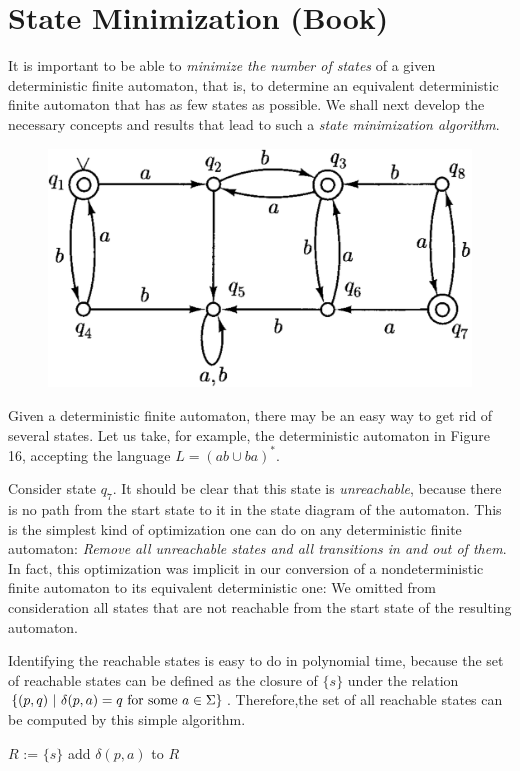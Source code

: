 \section{State Minimization (Book)}

It is important to be able to \textit{minimize the number of states} of a given deterministic finite automaton, that is, to determine an equivalent deterministic finite automaton that has as few states as possible. We shall next develop the necessary concepts and results that lead to such a \textit{state minimization algorithm}.

\begin{figure}[h!]
  \centering
  \includegraphics[width=.4\textwidth]{img/Fig2.19.png}
  \caption{}
\end{figure}

Given a deterministic finite automaton, there may be an easy way to get rid of several states. Let us take, for example, the deterministic automaton in Figure 16, accepting the language $L = (ab \cup ba)^*$. 

Consider state $q_7$. It should be clear that this state is \textit{unreachable}, because there is no path from the start state to it in the state diagram of the automaton. This is the simplest kind of optimization one can do on any deterministic finite automaton:\textit{ Remove all unreachable states and all transitions in and out of them}. In fact, this optimization was implicit in our conversion of a nondeterministic finite automaton to its equivalent deterministic one: We omitted from consideration all states that are not reachable from the start state of the resulting automaton.

Identifying the reachable states is easy to do in polynomial time, because the set of reachable states can be defined as the closure of $\{s\}$ under the relation $\left\{ (p, q)\ |\ \delta(p, a) = q \textnormal{ for some } a \in \Sigma \right\}$. Therefore,the set of all reachable states can be computed by this simple algorithm.

\begin{algorithm}
  \begin{algorithmic}
    \State $R$ := $\{s\}$
      \State add $\delta(p, a)$ to $R$
    \EndWhile
\end{algorithmic}
\end{algorithm}

